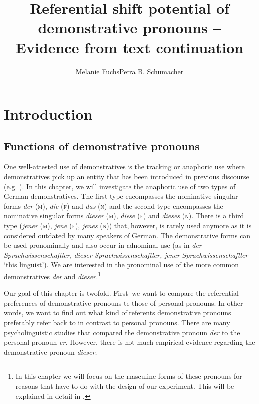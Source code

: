 \documentclass[output=paper,colorlinks,citecolor=brown]{langscibook}
\author{Melanie Fuchs\affiliation{University of Cologne}\orcid{}\lastand Petra B. Schumacher\affiliation{University of Cologne}\orcid{}}
\title{Referential shift potential of demonstrative pronouns – Evidence from text continuation}
\begin{document}
\maketitle
{}


\section{Introduction}\label{sec:fuchs:1}

\subsection{Functions of demonstrative pronouns}\label{sec:fuchs:1.1}

One well-attested use of demonstratives is the tracking or anaphoric use where demonstratives pick up an entity that has been introduced in previous discourse (e.g. \citealt{Himmelmann1996}). In this chapter, we will investigate the anaphoric use of two types of German demonstratives. The first type encompasses the nominative singular forms \textit{der} \textsc{(m)}, \textit{die} (\textsc{f)} and \textit{das} (\textsc{n)} and the second type encompasses the nominative singular forms \textit{dieser} (\textsc{m)}, \textit{diese} (\textsc{f)} and \textit{dieses} (\textsc{n)}. There is a third type (\textit{jener} (\textsc{m)}, \textit{jene} (\textsc{f)}, \textit{jenes} (\textsc{n)}) that, however, is rarely used anymore as it is considered outdated by many speakers of German. The demonstrative forms can be used pronominally and also occur in adnominal use (as in \textit{der} \textit{Sprachwissenschaftler,} \textit{dieser} \textit{Sprachwissenschaftler,} \textit{jener} \textit{Sprachwissenschaftler} ‘this linguist’). We are interested in the pronominal use of the more common demonstratives \textit{der} and \textit{dieser.}\footnote{In this chapter we will focus on the masculine forms of these pronouns for reasons that have to do with the design of our experiment. This will be explained in detail in .} 

Our goal of this chapter is twofold. First, we want to compare the referential preferences of demonstrative pronouns to those of personal pronouns. In other words, we want to find out what kind of referents demonstrative pronouns preferably refer back to in contrast to personal pronouns. There are many psycholinguistic studies that compared the demonstrative pronoun \textit{der} to the personal pronoun \textit{er.} However, there is not much empirical evidence regarding the demonstrative pronoun \textit{dieser.}
\end{document}
